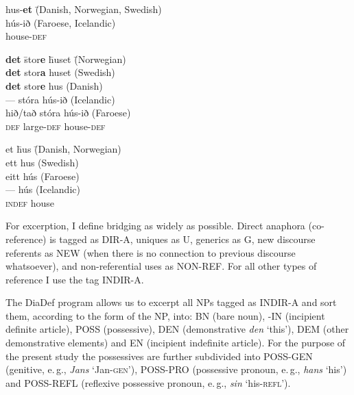\documentclass[output=paper]{langsci/langscibook}
\begin{document}
\begin{exe}
\ex\label{6ex:16}
\begin{tabbing}
hus-{\textbf{et}}\hspace*{5.2cm} \= (Danish, Norwegian, Swedish) \\
hús-ið \> (Faroese, Icelandic) \\
house-{\textsc{def}}
\end{tabbing}

\ex\label{6ex:17}
\begin{tabbing}
{\textbf{det}}\hspace*{1.3cm} \= 	stor{\textbf{e}}\hspace*{1.3cm} \= huset\hspace*{1.3cm} \= (Norwegian) \\
{\textbf{det}}  \> stor{\textbf{a}} \> huset \> (Swedish) \\
{\textbf{det}} \> stor{\textbf{e}} \> hus \> (Danish) \\
--- \> stóra \> hús-ið \> (Icelandic) \\
hið/tað \> stóra \> hús-ið \> (Faroese) \\
{\textsc{def}} \> large-{\textsc{def}} \> house-{\textsc{def}}
\end{tabbing}

\ex\label{6ex:18}
\begin{tabbing}
et\hspace*{1.52cm} \= hus\hspace*{3.8cm} \= (Danish, Norwegian) \\
ett \> hus \> (Swedish) \\
eitt \> hús \> (Faroese) \\
--- \> hús \> (Icelandic) \\
{\textsc{indef}} \> house
\end{tabbing}
\end{exe}

For excerption, I define bridging as widely as possible. Direct anaphora (co-reference) is tagged as DIR-A, uniques as U, generics as G, new discourse referents as NEW (when there is no connection to previous discourse whatsoever), and non-referential uses as NON-REF. For all other types of reference I use the tag INDIR-A.



The DiaDef program allows us to excerpt all NPs tagged as INDIR-A and sort them, according to the form of the NP, into: BN (bare noun), -IN (incipient definite article), POSS (possessive), DEN (demonstrative {\emph{den}} `this'), DEM (other demonstrative elements) and EN (incipient indefinite article). For the purpose of the present study the possessives are further subdivided into POSS-GEN (genitive, e.\,g., {\emph{Jans}} `Jan-{\textsc{gen}}'), POSS-PRO (possessive pronoun, e.\,g., {\emph{hans}} `his') and POSS-REFL (reflexive possessive pronoun, e.\,g., {\emph{sin}} `his-{\textsc{refl}}').
\end{document}
